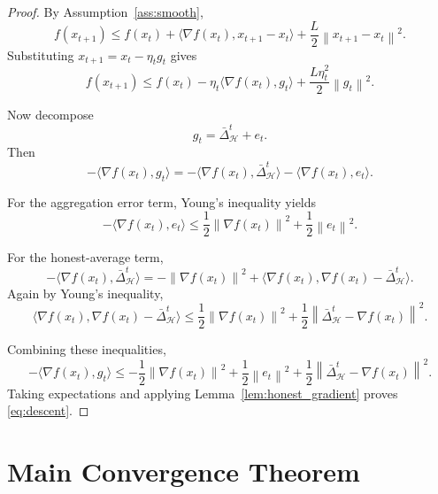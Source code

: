 \documentclass[11pt,a4paper]{article}
\theoremstyle{remark}
\newcommand{\HH}{\mathcal{H}}
\newcommand{\norm}[1]{\left\lVert #1 \right\rVert}
\begin{document}
\begin{proof}
By Assumption~\ref{ass:smooth},
\[
    f(x_{t+1})
    \le
    f(x_t)
    +
    \langle \nabla f(x_t), x_{t+1}-x_t \rangle
    +
    \frac{L}{2}\norm{x_{t+1}-x_t}^2.
\]
Substituting \(x_{t+1}=x_t-\eta_t g_t\) gives
\[
    f(x_{t+1})
    \le
    f(x_t)
    -
    \eta_t \langle \nabla f(x_t), g_t \rangle
    +
    \frac{L\eta_t^2}{2}\norm{g_t}^2.
\]

Now decompose
\[
    g_t = \bar{\Delta}_{\HH}^t + e_t.
\]
Then
\[
    -\langle \nabla f(x_t), g_t \rangle
    =
    -\langle \nabla f(x_t), \bar{\Delta}_{\HH}^t \rangle
    -
    \langle \nabla f(x_t), e_t \rangle.
\]

For the aggregation error term, Young's inequality yields
\[
    -\langle \nabla f(x_t), e_t \rangle
    \le
    \frac{1}{2}\norm{\nabla f(x_t)}^2 + \frac{1}{2}\norm{e_t}^2.
\]

For the honest-average term,
\[
    -\langle \nabla f(x_t), \bar{\Delta}_{\HH}^t \rangle
    =
    -\norm{\nabla f(x_t)}^2
    +
    \langle \nabla f(x_t), \nabla f(x_t)-\bar{\Delta}_{\HH}^t \rangle.
\]
Again by Young's inequality,
\[
    \langle \nabla f(x_t), \nabla f(x_t)-\bar{\Delta}_{\HH}^t \rangle
    \le
    \frac{1}{2}\norm{\nabla f(x_t)}^2
    +
    \frac{1}{2}\norm{\bar{\Delta}_{\HH}^t-\nabla f(x_t)}^2.
\]

Combining these inequalities,
\[
    -\langle \nabla f(x_t), g_t \rangle
    \le
    -\frac{1}{2}\norm{\nabla f(x_t)}^2
    +
    \frac{1}{2}\norm{e_t}^2
    +
    \frac{1}{2}\norm{\bar{\Delta}_{\HH}^t-\nabla f(x_t)}^2.
\]
Taking expectations and applying Lemma~\ref{lem:honest_gradient} proves
\eqref{eq:descent}.
\end{proof}

\section{Main Convergence Theorem}
\end{document}
